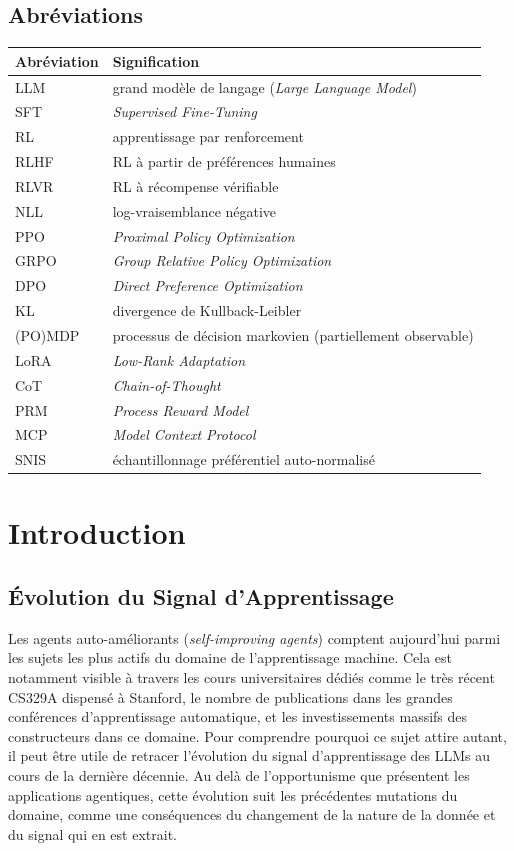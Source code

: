 \documentclass[11pt,a4paper]{article}
\begin{document}
\subsection*{Abréviations}
\begin{tabular}{ll}
\toprule
Abréviation & Signification \\
\midrule
LLM & grand modèle de langage (\emph{Large Language Model}) \\
SFT & \emph{Supervised Fine-Tuning} \\
RL & apprentissage par renforcement \\
RLHF & RL à partir de préférences humaines \\
RLVR & RL à récompense vérifiable \\
NLL & log-vraisemblance négative \\
PPO & \emph{Proximal Policy Optimization} \\
GRPO & \emph{Group Relative Policy Optimization} \\
DPO & \emph{Direct Preference Optimization} \\
KL & divergence de Kullback-Leibler \\
(PO)MDP & processus de décision markovien (partiellement observable) \\
LoRA & \emph{Low-Rank Adaptation} \\
CoT & \emph{Chain-of-Thought} \\
PRM & \emph{Process Reward Model} \\
MCP & \emph{Model Context Protocol} \\
SNIS & échantillonnage préférentiel auto-normalisé \\
\bottomrule
\end{tabular}



\newpage
\section{Introduction}

\subsection{Évolution du Signal d'Apprentissage}

Les agents auto-améliorants (\emph{self-improving agents}) comptent aujourd'hui parmi les sujets les plus actifs du domaine de l'apprentissage machine. Cela est notamment visible à travers les cours universitaires dédiés comme le très récent CS329A dispensé à Stanford, le nombre de publications dans les grandes conférences d'apprentissage automatique, et les investissements massifs des constructeurs dans ce domaine. Pour comprendre pourquoi ce sujet attire autant, il peut être utile de retracer l'évolution du signal d'apprentissage des LLMs au cours de la dernière décennie. Au delà de l'opportunisme que présentent les applications agentiques, cette évolution suit les précédentes mutations du domaine, comme une conséquences du changement de la nature de la donnée et du signal qui en est extrait.
\end{document}
